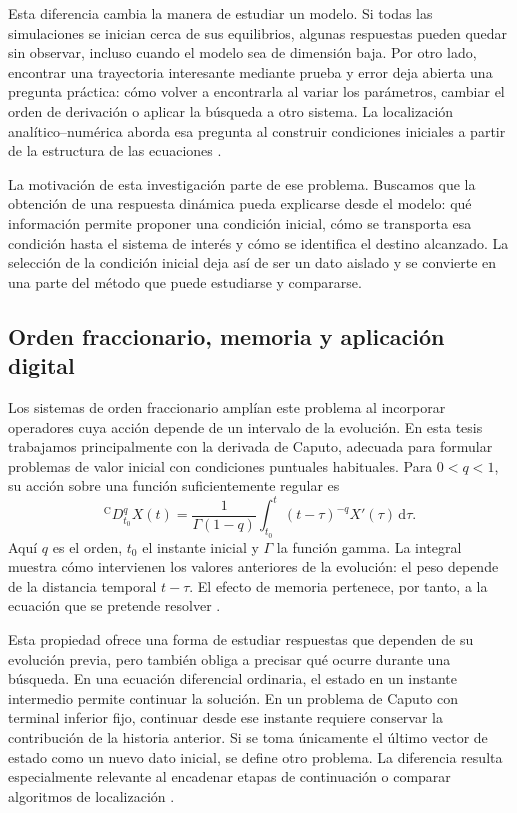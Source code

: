 Esta diferencia cambia la manera de estudiar un modelo. Si todas las
simulaciones se inician cerca de sus equilibrios, algunas respuestas pueden
quedar sin observar, incluso cuando el modelo sea de dimensión baja. Por
otro lado, encontrar una trayectoria interesante mediante prueba y error
deja abierta una pregunta práctica: cómo volver a encontrarla al variar
los parámetros, cambiar el orden de derivación o aplicar la búsqueda a
otro sistema. La localización analítico--numérica aborda esa pregunta al
construir condiciones iniciales a partir de la estructura de las ecuaciones
\cite{LeonovKuznetsovVagaitsev2011,KuznetsovEtAl2017}.

La motivación de esta investigación parte de ese problema. Buscamos que la
obtención de una respuesta dinámica pueda explicarse desde el modelo: qué
información permite proponer una condición inicial, cómo se transporta esa
condición hasta el sistema de interés y cómo se identifica el destino
alcanzado. La selección de la condición inicial deja así de ser un dato
aislado y se convierte en una parte del método que puede estudiarse y
compararse.

\subsection{Orden fraccionario, memoria y aplicación digital}

Los sistemas de orden fraccionario amplían este problema al incorporar
operadores cuya acción depende de un intervalo de la evolución. En esta
tesis trabajamos principalmente con la derivada de Caputo, adecuada para
formular problemas de valor inicial con condiciones puntuales habituales.
Para \(0<q<1\), su acción sobre una función suficientemente regular es
\[
{}^{\mathrm C}D_{t_0}^{q}X(t)
=\frac{1}{\Gamma(1-q)}
\int_{t_0}^{t}(t-\tau)^{-q}X'(\tau)\,\mathrm d\tau.
\]
Aquí \(q\) es el orden, \(t_0\) el instante inicial y \(\Gamma\) la función
gamma. La integral muestra cómo intervienen los valores anteriores de la
evolución: el peso depende de la distancia temporal \(t-\tau\). El efecto
de memoria pertenece, por tanto, a la ecuación que se pretende resolver
\cite{Podlubny1999,Diethelm2010AnalysisFDE}.

Esta propiedad ofrece una forma de estudiar respuestas que dependen de su
evolución previa, pero también obliga a precisar qué ocurre durante una
búsqueda. En una ecuación diferencial ordinaria, el estado en un instante
intermedio permite continuar la solución. En un problema de Caputo con
terminal inferior fijo, continuar desde ese instante requiere conservar la
contribución de la historia anterior. Si se toma únicamente el último
vector de estado como un nuevo dato inicial, se define otro problema.
La diferencia resulta especialmente relevante al encadenar etapas de
continuación o comparar algoritmos de localización
\cite{Diethelm2020_afcee,DoanKloeden2021Semidynamical}.

